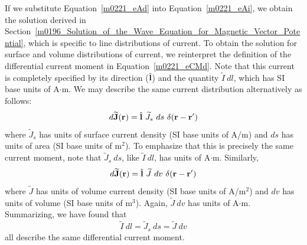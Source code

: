 If we substitute Equation~\ref{m0221_eAd} into Equation~\ref{m0221_eAi}, we obtain the solution derived in Section~\ref{m0196_Solution_of_the_Wave_Equation_for_Magnetic_Vector_Potential}, which is specific to line distributions of current.
To obtain the solution for surface and volume distributions of current, we reinterpret the definition of the differential current moment in Equation~\ref{m0221_eCMd}.
Note that this current is completely specified by its direction ($\hat{\bf l}$) and the quantity $\widetilde{I}~dl$, which has SI base units of A$\cdot$m.  
We may describe the same current distribution alternatively as follows:
%
\begin{equation}
d\widetilde{\bf J}({\bf r}) = \hat{\bf l}~\widetilde{J}_s~ds~\delta({\bf r}-{\bf r}')
\label{m0221_eCM2}
\end{equation}
%
where $\widetilde{J}_s$ has units of surface current density (SI base units of A/m) and $ds$ has units of area (SI base units of m$^2$).
To emphasize that this is precisely the same current moment, note that $\widetilde{J}_s~ds$, like $\widetilde{I}~dl$, has units of A$\cdot$m.
Similarly, 
%
\begin{equation}
d\widetilde{\bf J}({\bf r}) = \hat{\bf l}~\widetilde{J}~dv~\delta({\bf r}-{\bf r}')
\label{m0221_eCM3}
\end{equation}
%
where $\widetilde{J}$ has units of volume current density (SI base units of A/m$^2$) and $dv$ has units of volume (SI base units of m$^3$).
Again, $\widetilde{J}~dv$ has units of A$\cdot$m.
Summarizing, we have found that
%
\begin{equation}
\widetilde{I}~dl = \widetilde{J}_s~ds = \widetilde{J}~dv
\label{m0221_eCDE}
\end{equation}
%
all describe the same differential current moment. 
 
